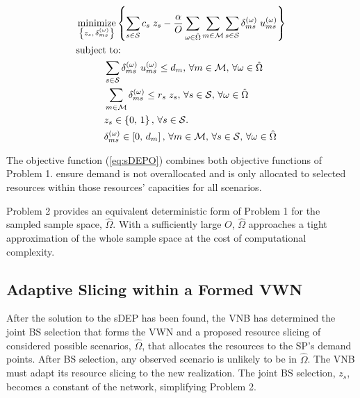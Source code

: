 \documentclass[conference]{IEEEtran}
\DeclareMathOperator*{\argmin}{minimize}
\begin{document}
\begin{tcolorbox}[floatplacement = !ht, float, title = Problem 2: Sampled DEP (sDEP)]
\begin{align}
& \argmin_{\left\{ z_s,\, \delta_{ms}^{\left( \omega \right)} \right\}} \left\{ \sum_{s \in \mathcal{S}} c_s \; z_s - \frac{\alpha}{O} \sum_{\omega \in \hat{\Omega}} \sum_{m \in \mathcal{M}} \sum_{s \in \mathcal{S}} \delta_{ms}^{\left( \omega \right)} \; u_{ms}^{\left( \omega \right)} \right\} \label{eq:sDEPO}\\
& \text{subject to:}  \nonumber \\
& \hspace{0.4in} \sum_{s \in \mathcal{S}} \delta_{ms}^{\left( \omega \right)} \; u_{ms}^{\left( \omega \right)} \leq d_m,\, \forall m \in \mathcal{M},\, \forall \omega \in \hat{\Omega} \label{eq:sDEPC1}\\
& \hspace{0.4in} \sum_{m \in \mathcal{M}} \delta_{ms}^{\left( \omega \right)} \leq r_s \; z_s,\, \forall s \in \mathcal{S},\, \forall \omega \in \hat{\Omega} \label{eq:sDEPC2}\\
& \hspace{0.4in} z_s \in \left\{ 0,\, 1 \right\},\, \forall s \in \mathcal{S}. \label{eq:sDEPC3}\\
& \hspace{0.4in} \delta_{ms}^{\left( \omega \right)} \in \left[ 0,\, d_m \right],\, \forall m \in \mathcal{M},\, \forall s \in \mathcal{S},\, \forall \omega \in \hat{\Omega} \label{eq:sDEPC4}
\end{align}
\end{tcolorbox}

The objective function (\cref{eq:sDEPO}) combines both objective functions of Problem 1.   ensure demand is not overallocated and is only allocated to selected resources within those resources' capacities for all scenarios.

Problem 2 provides an equivalent deterministic form of Problem 1 for the sampled sample space, $\hat{\Omega}$.  With a sufficiently large $O$, $\hat{\Omega}$ approaches a tight approximation of the whole sample space at the cost of computational complexity.

\subsection{Adaptive Slicing within a Formed VWN} \label{subsec:slice}

After the solution to the sDEP has been found, the VNB has determined the joint BS selection that forms the VWN and a proposed resource slicing of considered possible scenarios, $\hat{\Omega}$, that allocates the resources to the SP's demand points.  After BS selection, any observed scenario is unlikely to be in $\hat{\Omega}$.  The VNB must adapt its resource slicing to the new realization.  The joint BS selection, $z_s$, becomes a constant of the network, simplifying Problem 2.
\end{document}
